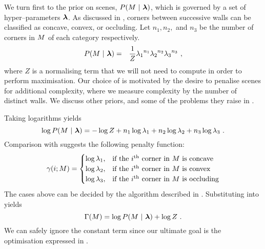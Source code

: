 We turn first to the prior on scenes, $P(\Scene~|~\Penalties)$, which
is governed by a set of hyper--parameters $\Penalties$. As discussed in
, corners between successive walls can be
classified as concave, convex, or occluding. Let $n_1, n_2,$ and $n_3$
be the number of corners in $\Scene$ of each category
respectively. 
\begin{eqnarray}
  \label{eq:scene-prior}
  P(\Scene ~|~ \Penalties) &=& \frac{1}{Z}
    {\PenaltyConc}^{n_1} {\PenaltyConv}^{n_2} {\PenaltyOccl}^{n_3}~,
\end{eqnarray}
where $Z$ is a normalising term that we will not need to compute in
order to perform maximisation. Our choice of  is
motivated by the desire to penalise scenes for additional complexity,
where we measure complexity by the number of distinct walls. We
discuss other priors, and some of the problems they raise in
.

Taking logarithms yields
\begin{equation}
  \label{eq:log-scene-prior}
  \log P(\Scene ~|~ \Penalties) =
    -\log Z +
    n_1\log\PenaltyConc + 
    n_2\log\PenaltyConv + 
    n_3\log\PenaltyOccl~.
\end{equation}
Comparison with  suggests the following
penalty function:
\begin{equation}
  \label{eq:corner-penalty}
  \CornerPenalty(i;\Scene) = 
  \begin{cases}
    \log \PenaltyConc, &
      \mbox{if the $i$\th corner in $\Scene$ is concave} \\
    \log \PenaltyConv, &
      \mbox{if the $i$\th corner in $\Scene$ is convex} \\
    \log \PenaltyOccl, &
      \mbox{if the $i$\th corner in $\Scene$ is occluding} \\
  \end{cases}
\end{equation}
The cases above can be decided by the algorithm described in
. Substituting  into
 yields
\begin{equation}
  \ScenePenalty(\Scene) = \log P(\Scene ~|~ \Penalties) + \log Z~.
\end{equation}
We can safely ignore the constant term since our ultimate goal is the
optimisation expressed in .

